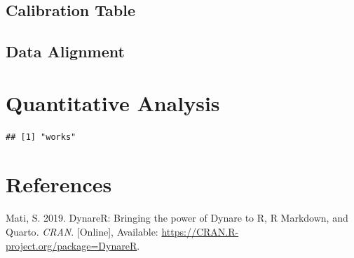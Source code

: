 \documentclass[11pt,preprint]{elsarticle}
\numberwithin{equation}{section}
\numberwithin{figure}{section}
\numberwithin{table}{section}
\newlength{\cslhangindent}
\newenvironment{CSLReferences}[2] %
{\begin{list}{}{%
	\setlength{\itemindent}{0pt}
	\setlength{\leftmargin}{0pt}
	\setlength{\parsep}{0pt}
	\ifodd #1
	\setlength{\leftmargin}{\cslhangindent}
	\setlength{\itemindent}{-1\cslhangindent}
	\fi
	\setlength{\itemsep}{#2\baselineskip}}}
{\end{list}}
\begin{document}
\subsection{Calibration Table}\label{calibration-table}

\subsection{Data Alignment}\label{data-alignment}

\section{Quantitative Analysis}\label{quantitative-analysis}

\begin{verbatim}
## [1] "works"
\end{verbatim}

\newpage

\section*{References}\label{references}

\label{refs}
\begin{CSLReferences}{1}{1}
Mati, S. 2019. DynareR: Bringing the power of {Dynare} to {R}, {R
Markdown}, and {Quarto}. \emph{CRAN}. {[}Online{]}, Available:
\url{https://CRAN.R-project.org/package=DynareR}.

\end{CSLReferences}


\end{document}
